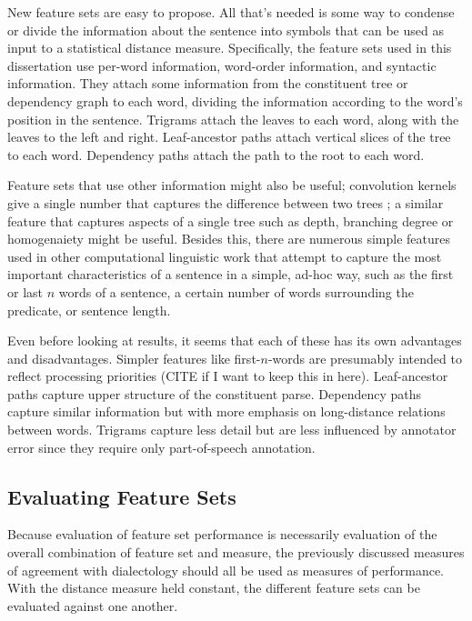 New feature sets are easy to propose. All that's needed is some way to
condense or divide the information about the sentence into symbols
that can be used as input to a statistical distance
measure. Specifically, the feature sets used in this dissertation use
per-word information, word-order information, and syntactic
information. They attach some information from the constituent tree or
dependency graph to each word, dividing the information according to
the word's position in the sentence. Trigrams attach the leaves to
each word, along with the leaves to the left and right.
Leaf-ancestor paths attach vertical slices of the tree to each
word. Dependency paths attach the path to the root to each word.

Feature sets that use other information might also be useful;
convolution kernels give a single number that captures the difference
between two trees \cite{collins01}; a similar feature that captures
aspects of a single tree such as depth, branching degree or
homogenaiety might be useful. Besides this, there are numerous simple
features used in other computational linguistic work that attempt to
capture the most important characteristics of a sentence in a simple,
ad-hoc way, such as the first or last $n$ words of a sentence, a
certain number of words surrounding the predicate, or sentence length.

Even before looking at results, it seems that each of these has its
own advantages and disadvantages. Simpler features like
first-$n$-words are presumably intended to reflect
processing priorities (CITE if I want to keep this in
here). Leaf-ancestor paths capture upper structure of the constituent
parse. Dependency paths capture similar information but with more
emphasis on long-distance relations between words. Trigrams capture
less detail but are less influenced by annotator error since they
require only part-of-speech annotation.

\subsection{Evaluating Feature Sets}

Because evaluation of feature set performance is necessarily evaluation
of the overall combination of feature set and measure, the previously
discussed measures of agreement with dialectology should all be used
as measures of performance. With the distance measure held constant,
the different feature sets can be evaluated against one another.

